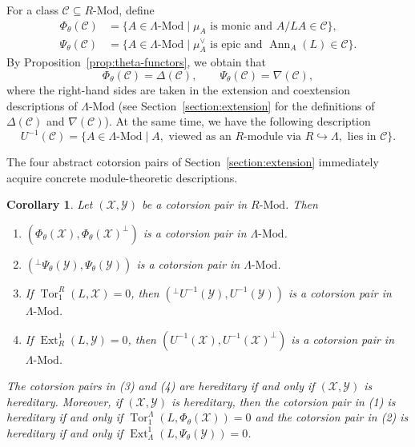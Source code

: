 \documentclass[11pt,reqno]{amsart}
\numberwithin{equation}{section}
\newtheorem{corollary}[theorem]{Corollary}
\newcommand{\cX}{\mathcal X}
\newcommand{\cY}{\mathcal Y}
\newcommand{\cC}{\mathcal C}
\newcommand{\Ext}{\operatorname{Ext}}
\newcommand{\Tor}{\operatorname{Tor}}
\newcommand{\Mod}{\text{-}\mathrm{Mod}}
\begin{document}
For a class $\cC\subseteq R\text{-Mod}$, define
\begin{align*}
\Phi_\theta(\cC)
&=\{A\in\Lambda\text{-Mod}\mid \mu_A\text{ is monic and }A/LA\in\cC\},\\
\Psi_\theta(\cC)
&=\{A\in\Lambda\text{-Mod}\mid \mu^\vee_A\text{ is epic and }\operatorname{Ann}_A(L)\in\cC\}.
\end{align*}
By Proposition~\ref{prop:theta-functors}, we obtain that
\[
\Phi_\theta(\cC)=\Delta(\cC),
\qquad
\Psi_\theta(\cC)=\nabla(\cC),
\]
where the right-hand sides are taken in the extension and coextension descriptions of $\Lambda\text{-Mod}$ (see Section~\ref{section:extension} for the definitions of $\Delta(\cC)$ and $\nabla(\cC)$).
At the same time, we have the following description
\[
U^{-1}(\cC)=\{A\in \Lambda\Mod\mid A, \text{ viewed as an } R \text{-module via } R\hookrightarrow \Lambda, \text{ lies in }\cC\}.
\]

The four abstract cotorsion pairs of Section~\ref{section:extension} immediately acquire concrete module-theoretic descriptions.

\begin{corollary}\label{cor:theta-four-pairs}
Let $(\cX,\cY)$ be a cotorsion pair in $R\text{-Mod}$. Then %
\begin{enumerate}[label=\textup{(\arabic*)}]
\item $(\Phi_\theta(\cX),\Phi_\theta(\cX)^\perp)$ is a cotorsion pair in $\Lambda\text{-Mod}$.
\item $({}^\perp\Psi_\theta(\cY),\Psi_\theta(\cY))$ is a cotorsion pair in $\Lambda\text{-Mod}$.
\item If $\Tor_1^R(L,\cX)=0$, then
$({}^\perp U^{-1}(\cY),U^{-1}(\cY))$ is a cotorsion pair in $\Lambda\text{-Mod}$.
\item If $\Ext_R^1(L,\cY)=0$, then
$(U^{-1}(\cX),U^{-1}(\cX)^\perp)$  is a cotorsion pair in $\Lambda\text{-Mod}$.
\end{enumerate}
The cotorsion pairs in \textup{(3)} and \textup{(4)} are hereditary if and only if $(\cX,\cY)$ is hereditary. Moreover, if $(\cX,\cY)$ is hereditary, then
the cotorsion pair in \textup{(1)} is hereditary if and only if  $\Tor_1^\Lambda(L,\Phi_\theta(\cX))=0$ and the cotorsion pair in \textup{(2)} is hereditary if and only if $\Ext_\Lambda^1(L,\Psi_\theta(\cY))=0$.
\end{corollary}
\end{document}
